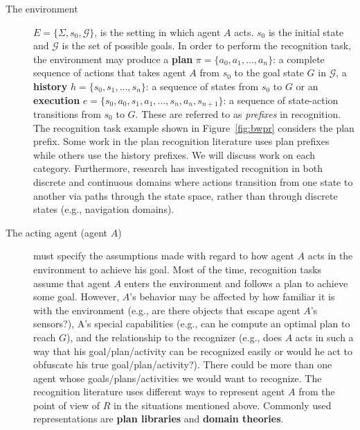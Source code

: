 \begin{description}
\item [The environment] $E = \lbrace \Sigma, s_0, \mathcal{G}\rbrace$, is the setting in which agent $A$ acts. $s_0$ is the initial state and $\mathcal{G}$ is the set of possible goals. 
In order to perform the recognition task, the environment may produce a \textbf{plan} $\pi=\lbrace a_0, a_1, \ldots, a_n\rbrace$: a complete sequence of actions that takes agent $A$ from $s_0$ to the goal state $G$ in $\mathcal{G}$, a \textbf{history} $h=\lbrace s_0, s_1, \ldots, s_n\rbrace$: a sequence of states from $s_0$ to $G$ or an \textbf{execution} $e=\lbrace s_0, a_0, s_1, a_1, \ldots, s_n, a_n, s_{n+1}\rbrace$: a sequence of state-action transitions from $s_0$ to $G$. 
These are referred to as \textit{prefixes} in recognition. 
The recognition task example shown in Figure~\ref{fig:bwpr} considers the plan prefix. Some work in the plan recognition literature uses plan prefixes while others use the history prefixes. We will discuss work on each category. Furthermore, research has investigated recognition in both discrete and continuous domains where actions transition from one state to another via paths through the state space, rather than through discrete states (e.g., navigation domains).

\item [The acting agent (agent $A$)] must specify the assumptions made with regard to how agent $A$ acts in the environment to achieve his goal. Most of the time, recognition tasks assume that agent $A$ enters the environment and follows a plan to achieve some goal. However, $A$'s behavior may be affected by how familiar it is with the environment (e.g., are there objects that escape agent $A$'s sensors?), A's special capabilities (e.g., can he compute an optimal plan to reach $G$), and the relationship to the recognizer (e.g., does $A$ acts in such a way that his goal/plan/activity can be recognized easily or would he act to obfuscate his true goal/plan/activity?). There could be more than one agent whose goals/plans/activities we would want to recognize.
The recognition literature uses different ways to represent agent $A$ from the point of view of $R$ in the situations mentioned above. Commonly used representations are \textbf{plan libraries} and \textbf{domain theories}.


\end{description}
